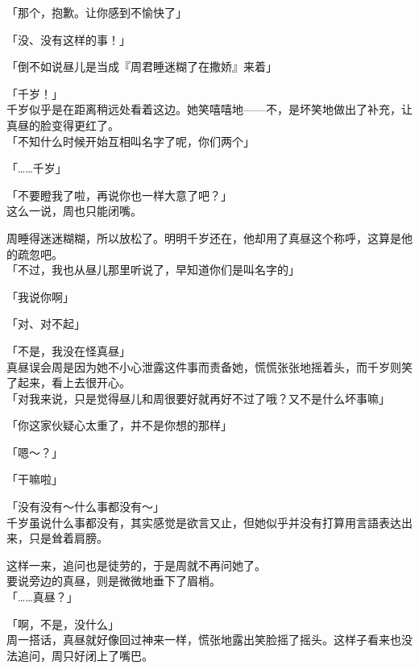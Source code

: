 「那个，抱歉。让你感到不愉快了」

「没、没有这样的事！」

「倒不如说昼儿是当成『周君睡迷糊了在撒娇』来着」

「千岁！」\\

千岁似乎是在距离稍远处看着这边。她笑嘻嘻地——不，是坏笑地做出了补充，让真昼的脸变得更红了。\\

「不知什么时候开始互相叫名字了呢，你们两个」

「……千岁」

「不要瞪我了啦，再说你也一样大意了吧？」\\

这么一说，周也只能闭嘴。

周睡得迷迷糊糊，所以放松了。明明千岁还在，他却用了真昼这个称呼，这算是他的疏忽吧。\\

「不过，我也从昼儿那里听说了，早知道你们是叫名字的」

「我说你啊」

「对、对不起」

「不是，我没在怪真昼」\\

真昼误会周是因为她不小心泄露这件事而责备她，慌慌张张地摇着头，而千岁则笑了起来，看上去很开心。\\%

「对我来说，只是觉得昼儿和周很要好就再好不过了哦？又不是什么坏事嘛」

「你这家伙疑心太重了，并不是你想的那样」

「嗯～？」

「干嘛啦」

「没有没有～什么事都没有～」\\

千岁虽说什么事都没有，其实感觉是欲言又止，但她似乎并没有打算用言語表达出来，只是耸着肩膀。

这样一来，追问也是徒劳的，于是周就不再问她了。\\

要说旁边的真昼，则是微微地垂下了眉梢。\\

「……真昼？」

「啊，不是，没什么」\\

周一搭话，真昼就好像回过神来一样，慌张地露出笑脸摇了摇头。这样子看来也没法追问，周只好闭上了嘴巴。\\

